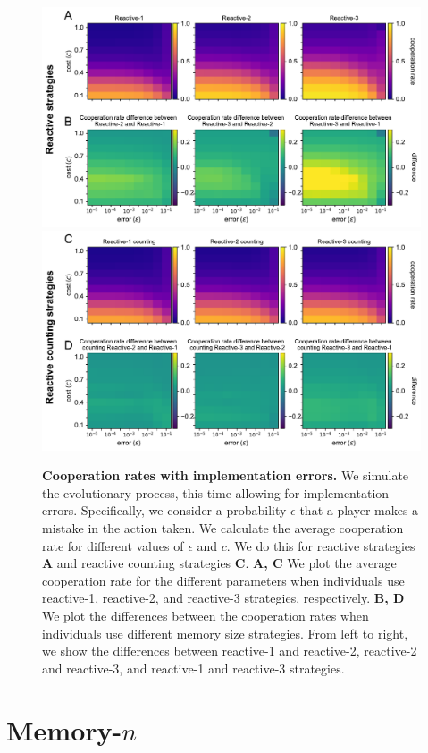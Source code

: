 \documentclass[11pt]{article}
\theoremstyle{plainCl1}
\theoremstyle{plainCl2}
\begin{document}
\begin{figure}[h]
    \centering
    \includegraphics[width=.65\textwidth]{../../figures/siFig2Errors.pdf} \\[2em]
    \includegraphics[width=.65\textwidth]{../../figures/siFigErrorsCounting.pdf}
    \caption{
    \textbf{Cooperation rates with implementation errors.}
  We simulate the evolutionary process, this time allowing for implementation
  errors. Specifically, we consider a probability \(\epsilon\) that a player makes
  a mistake in the action taken. We calculate the average cooperation rate for
  different values of \(\epsilon\) and \(c\). We do this for reactive strategies
  {\bf A} and reactive counting strategies {\bf C}. {\bf A, C} We plot the average
  cooperation rate for the different parameters when individuals use reactive-1,
  reactive-2, and reactive-3 strategies, respectively. {\bf B, D} We plot the
  differences between the cooperation rates when individuals use different memory
  size strategies. From left to right, we show the differences between reactive-1
  and reactive-2, reactive-2 and reactive-3, and reactive-1 and reactive-3
  strategies.
    }\label{fig:errors}
\end{figure}




\newpage

\section{Memory-$n$}
\end{document}
